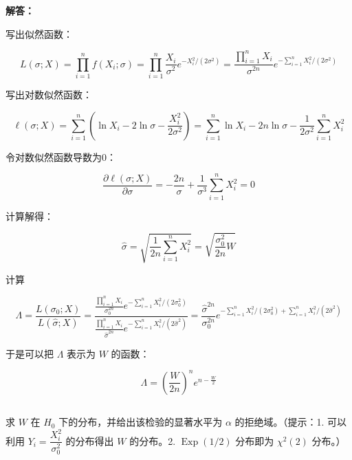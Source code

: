 \documentclass[12pt,a4paper]{article}
\begin{document}
\begin{answerbox}
\textbf{解答：}

写出似然函数：

$$
L(\sigma; X) = \prod_{i=1}^n f(X_i; \sigma) = \prod_{i=1}^n \frac{X_i}{\sigma^2} e^{-X_i^2/(2\sigma^2)} = \frac{\prod_{i=1}^n X_i}{\sigma^{2n}} e^{-\sum_{i=1}^n X_i^2/(2\sigma^2)}
$$

写出对数似然函数：

$$
\ell(\sigma; X) = \sum_{i=1}^n \left( \ln X_i - 2 \ln \sigma - \frac{X_i^2}{2\sigma^2} \right) = \sum_{i=1}^n \ln X_i - 2n \ln \sigma - \frac{1}{2\sigma^2} \sum_{i=1}^n X_i^2
$$

令对数似然函数导数为0：

$$
\frac{\partial \ell(\sigma; X)}{\partial \sigma} = -\frac{2n}{\sigma} + \frac{1}{\sigma^3} \sum_{i=1}^n X_i^2 = 0
$$

计算解得：

$$
\hat{\sigma} = \sqrt{\frac{1}{2n} \sum_{i=1}^n X_i^2}=\sqrt{\frac{\sigma_0^2}{2n}W}
$$

计算

$$
\Lambda = \frac{L(\sigma_0; X)}{L(\hat{\sigma}; X)}= \frac{\frac{\prod_{i=1}^n X_i}{\sigma_0^{2n}} e^{-\sum_{i=1}^n X_i^2/(2\sigma_0^2)}}{\frac{\prod_{i=1}^n X_i}{\hat{\sigma}^{2n}} e^{-\sum_{i=1}^n X_i^2/(2\hat{\sigma}^2)}} = \frac{\hat{\sigma}^{2n}}{\sigma_0^{2n}} e^{-\sum_{i=1}^n X_i^2/(2\sigma_0^2) + \sum_{i=1}^n X_i^2/(2\hat{\sigma}^2)}
$$

于是可以把 $\Lambda$ 表示为 $W$ 的函数：

$$
\Lambda = \left(\frac{W}{2n}\right)^n e^{n - \frac{W}{2}}
$$

\end{answerbox}

\subsection{}

求 $W$ 在 $H_0$ 下的分布，并给出该检验的显著水平为 $\alpha$ 的拒绝域。（提示：1. 可以利用 $Y_i=\dfrac{X_i^2}{\sigma_0^2}$ 的分布得出 $W$ 的分布。2. $\operatorname{Exp}(1/2)$ 分布即为 $\chi^2(2)$ 分布。）
\end{document}
